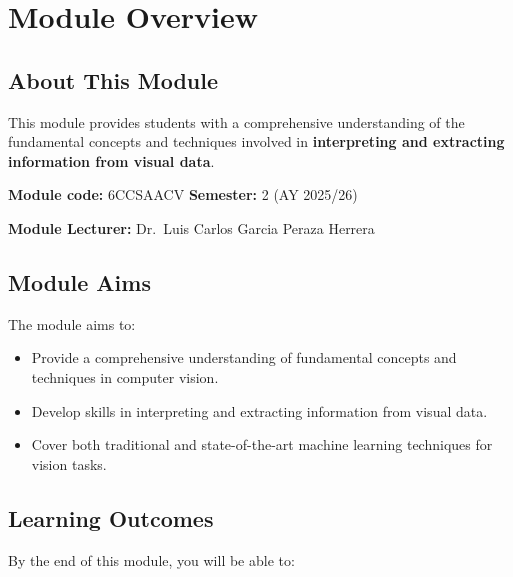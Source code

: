 \section*{Module Overview}

\subsection*{About This Module}

This module provides students with a comprehensive understanding of the fundamental concepts and techniques involved in \textbf{interpreting and extracting information from visual data}.

\textbf{Module code:} 6CCSAACV \hfill \textbf{Semester:} 2 (AY 2025/26)

\textbf{Module Lecturer:} Dr.\ Luis Carlos Garcia Peraza Herrera

\bigseparator

\subsection*{Module Aims}

The module aims to:
\begin{itemize}
  \item Provide a comprehensive understanding of fundamental concepts and techniques in computer vision.
  \item Develop skills in interpreting and extracting information from visual data.
  \item Cover both traditional and state-of-the-art machine learning techniques for vision tasks.
\end{itemize}

\bigseparator

\subsection*{Learning Outcomes}

By the end of this module, you will be able to:

